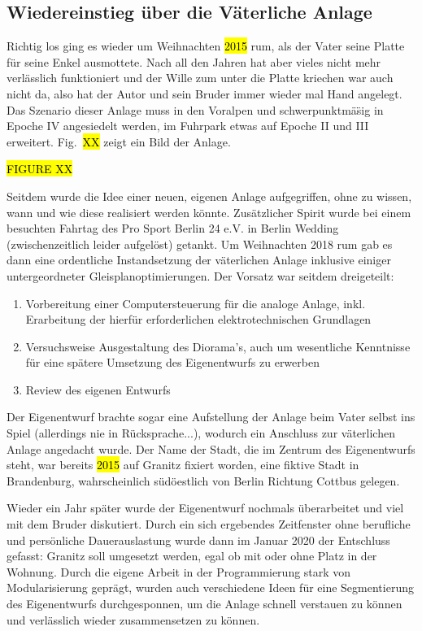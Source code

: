\subsection{Wiedereinstieg \"uber die V\"aterliche Anlage}
\label{sec:theReturn}

Richtig los ging es wieder um Weihnachten \hl{2015} rum, als der Vater seine Platte f\"ur seine Enkel ausmottete.
Nach all den Jahren hat aber vieles nicht mehr verl\"asslich funktioniert und der Wille zum unter die Platte kriechen war auch nicht da, also hat der Autor und sein Bruder immer wieder mal Hand angelegt.
Das Szenario dieser Anlage muss in den Voralpen und schwerpunktm\"a\"sig in Epoche IV angesiedelt werden, im Fuhrpark etwas auf Epoche II und III erweitert.
Fig.~\hl{XX} zeigt ein Bild der Anlage.

\hl{FIGURE XX}

Seitdem wurde die Idee einer neuen, eigenen Anlage aufgegriffen, ohne zu wissen, wann und wie diese realisiert werden k\"onnte.
Zus\"atzlicher Spirit wurde bei einem besuchten Fahrtag des Pro Sport Berlin 24 e.V. in Berlin Wedding (zwischenzeitlich leider aufgel\"ost) getankt.
Um Weihnachten 2018 rum gab es dann eine ordentliche Instandsetzung der v\"aterlichen Anlage inklusive einiger untergeordneter Gleisplanoptimierungen.
Der Vorsatz war seitdem dreigeteilt:
\begin{enumerate}
	\item Vorbereitung einer Computersteuerung f\"ur die analoge Anlage, inkl. Erarbeitung der hierf\"ur erforderlichen elektrotechnischen Grundlagen
	\item Versuchsweise Ausgestaltung des Diorama's, auch um wesentliche Kenntnisse f\"ur eine sp\"atere Umsetzung des Eigenentwurfs zu erwerben
	\item Review des eigenen Entwurfs
\end{enumerate}
Der Eigenentwurf brachte sogar eine Aufstellung der Anlage beim Vater selbst ins Spiel (allerdings nie in R\"ucksprache...), wodurch ein Anschluss zur v\"aterlichen Anlage angedacht wurde.
Der Name der Stadt, die im Zentrum des Eigenentwurfs steht, war bereits \hl{2015} auf Granitz fixiert worden, eine fiktive Stadt in Brandenburg, wahrscheinlich s\"ud\"oestlich von Berlin Richtung Cottbus gelegen.

Wieder ein Jahr sp\"ater wurde der Eigenentwurf nochmals \"uberarbeitet und viel mit dem Bruder diskutiert.
Durch ein sich ergebendes Zeitfenster ohne berufliche und pers\"onliche Dauerauslastung wurde dann im Januar 2020 der Entschluss gefasst:
Granitz soll umgesetzt werden, egal ob mit oder ohne Platz in der Wohnung.
Durch die eigene Arbeit in der Programmierung stark von Modularisierung gepr\"agt, wurden auch verschiedene Ideen f\"ur eine Segmentierung des Eigenentwurfs durchgesponnen, um die Anlage schnell verstauen zu k\"onnen und verl\"asslich wieder zusammensetzen zu k\"onnen.

